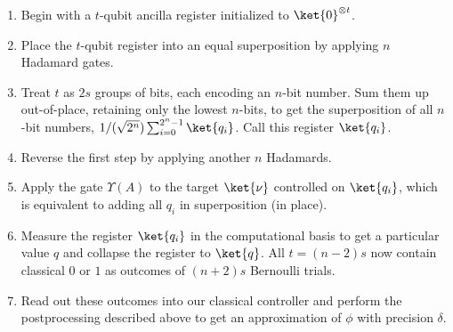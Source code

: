 \begin{enumerate}

\item Begin with a $t$-qubit ancilla register initialized to $\ket{0}^{\otimes t}$.

\item Place the $t$-qubit register into an equal superposition by
applying $n$ Hadamard gates.

\item Treat $t$ as $2s$ groups of bits, each encoding an $n$-bit number.
Sum them up out-of-place, retaining only the lowest $n$-bits,
to get the superposition
of all $n$-bit numbers, $1/(\sqrt{2^{n}}) \sum_{i=0}^{2^n-1} \ket{q_i}$.
Call this register $\ket{q_i}$.

\item Reverse the first step by applying another $n$ Hadamards.

\item Apply the gate $\Upsilon(A)$ to the target $\ket{\nu}$ controlled
on $\ket{q_i}$, which is equivalent to adding all $q_i$ in superposition
(in place).

\item Measure the register $\ket{q_i}$ in the computational basis to get 
a particular value $q$ and collapse the register to $\ket{q}$. All $t=(n-2)s$
now contain classical $0$ or $1$ as outcomes of $(n+2)s$ Bernoulli trials.

\item Read out these outcomes into our classical controller
and perform the postprocessing
described above to get an approximation of $\phi$ with precision $\delta$.

\end{enumerate}

